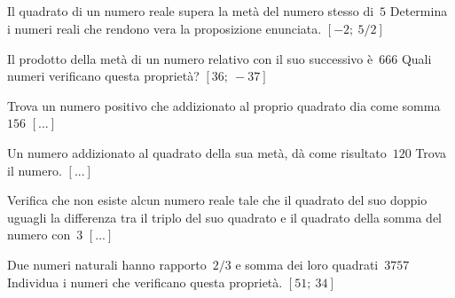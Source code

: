 \begin{htmulticols}{2}


\subsection*{}

\begin{esercizio}[*]
 \label{ese:3.112}
Il quadrato di un numero reale supera la metà del numero stesso di~\(5\)
Determina i numeri reali che rendono vera la proposizione enunciata.
\hfill\(\left[-2;~5/2\right]\)
\end{esercizio}

\begin{esercizio}[*]
 \label{ese:3.113}
Il prodotto della metà di un numero relativo con il suo successivo è~\(666\)
Quali numeri verificano questa proprietà?
\hfill\(\left[36;~-37\right]\)
\end{esercizio}

\begin{esercizio}
 \label{ese:3.114}
Trova un numero positivo che addizionato al proprio quadrato dia come 
somma~\(156\)
\hfill\(\left[...\right]\)
\end{esercizio}

\begin{esercizio}
 \label{ese:3.115}
Un numero addizionato al quadrato della sua metà, dà come risultato~\(120\)
Trova il numero.
\hfill\(\left[...\right]\)
\end{esercizio}

\begin{esercizio}
 \label{ese:3.116}
Verifica che non esiste alcun numero reale tale che il quadrato del suo
doppio uguagli la differenza tra il triplo del suo quadrato e il quadrato
della somma del numero con~\(3\)
\hfill\(\left[...\right]\)
\end{esercizio}

\begin{esercizio}[*]
 \label{ese:3.117}
Due numeri naturali hanno rapporto~\(2/3\) e somma dei loro 
quadrati~\(3757\)
Individua i numeri che verificano questa proprietà.
\hfill\(\left[51;~34\right]\)
\end{esercizio}


\end{htmulticols}
